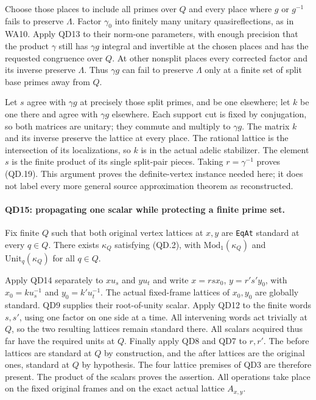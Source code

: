 Choose those places to include all primes over $Q$ and every
place where $g$ or $g^{-1}$ fails to preserve $\Lambda$.
Factor $\gamma_0$ into finitely many unitary quasireflections,
as in WA10.  Apply QD13 to their norm-one parameters, with
enough precision that the product $\gamma$ still has
$\gamma g$ integral and invertible at the chosen places and
has the requested congruence over $Q$.  At other nonsplit
places every corrected factor and its inverse preserve
$\Lambda$.  Thus $\gamma g$ can fail to preserve $\Lambda$
only at a finite set of split base primes away from $Q$.

Let $s$ agree with $\gamma g$ at precisely those split primes,
and be one elsewhere; let $k$ be one there and agree with
$\gamma g$ elsewhere.  Each support cut is fixed by conjugation,
so both matrices are unitary; they commute and multiply to
$\gamma g$.  The matrix $k$ and its inverse preserve the
lattice at every place.  The rational lattice is the intersection
of its localizations, so $k$ is in the actual adelic stabilizer.
The element $s$ is the finite product of its single split-pair
pieces.  Taking $r=\gamma^{-1}$ proves (QD.19).
This argument proves the definite-vertex instance needed here;
it does not label every more general source approximation
theorem as reconstructed.

\paragraph{QD15: propagating one scalar while protecting a finite prime set.}
Fix finite $Q$ such that both original vertex lattices at $x,y$
are \texttt{EqAt} standard at every $q\in Q$.  There exists
$\kappa_Q$ satisfying (QD.2), with $\mathrm{Mod}_1(\kappa_Q)$
and $\mathrm{Unit}_q(\kappa_Q)$ for all $q\in Q$.

Apply QD14 separately to $xu_s$ and $yu_t$ and write
$x=r s x_0$, $y=r's'y_0$, with
$x_0=k u_s^{-1}$ and $y_0=k'u_t^{-1}$.
The actual fixed-frame lattices of $x_0,y_0$ are globally standard.
QD9 supplies their root-of-unity scalar.  Apply QD12 to the
finite words $s,s'$, using one factor on one side at a time.
All intervening words act trivially at $Q$, so the two resulting
lattices remain standard there.  All scalars acquired thus far
have the required units at $Q$.  Finally apply QD8 and QD7
to $r,r'$.  The before lattices are standard at $Q$ by construction,
and the after lattices are the original ones, standard at $Q$
by hypothesis.  The four lattice premises of QD3 are therefore
present.  The product of the scalars proves the assertion.
All operations take place on the fixed original frames and on
the exact actual lattice $A_{x,y}$.

